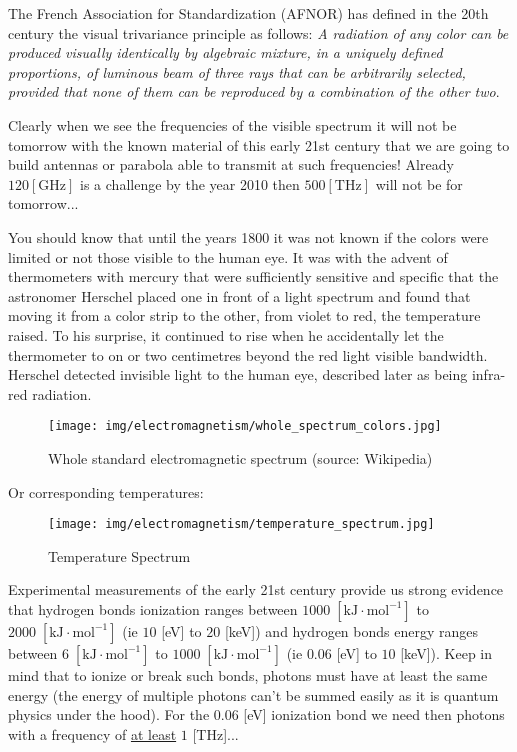	The French Association for Standardization (AFNOR) has defined in the 20th century the visual trivariance principle as follows:\textit{ A radiation of any color can be produced visually identically by algebraic mixture, in a uniquely defined proportions, of luminous beam of three rays that can be arbitrarily selected, provided that none of them can be reproduced by a combination of the other two}.
	
	Clearly when we see the frequencies of the visible spectrum it will not be tomorrow with the known material of this early 21st century that we are going to build antennas or parabola able to transmit at such frequencies! Already $120 [\text{GHz}]$ is a challenge by the year 2010 then $500 [\text{THz}]$ will not be for tomorrow...
	
	You should know that until the years 1800 it was not known if the colors were limited or not those visible to the human eye. It was with the advent of thermometers with mercury that were sufficiently sensitive and specific that the astronomer Herschel placed one in front of a light spectrum and found that moving it from a color strip to the other, from violet to red, the temperature raised. To his surprise, it continued to rise when he accidentally let the thermometer to on or two centimetres beyond the red light visible bandwidth. Herschel detected invisible light to the human eye, described later as being infra-red radiation.
	\begin{figure}[H]
		\centering
		\texttt{[image: img/electromagnetism/whole\_spectrum\_colors.jpg]}
		\caption[Whole standard electromagnetic spectrum]{Whole standard electromagnetic spectrum (source: Wikipedia)}
	\end{figure}
	Or corresponding temperatures:
	\begin{figure}[H]
		\centering
		\texttt{[image: img/electromagnetism/temperature\_spectrum.jpg]}
		\caption{Temperature Spectrum}
	\end{figure}
	
	\begin{tcolorbox}[title=Remark,colframe=black,arc=10pt]
	Experimental measurements of the early 21st century provide us strong evidence that hydrogen bonds ionization ranges between $1000\;[\text{kJ}\cdot \text{mol}^{-1}]$ to $2000\;[\text{kJ}\cdot \text{mol}^{-1}]$ (ie $10$ [eV] to $20$ [keV]) and hydrogen bonds energy ranges between $6\;[\text{kJ}\cdot \text{mol}^{-1}]$ to $1000\;[\text{kJ}\cdot \text{mol}^{-1}]$ (ie $0.06$ [eV] to $10$ [keV]). Keep in mind that to ionize or break such bonds, photons must have at least the same energy (the energy of multiple photons can't be summed easily as it is quantum physics under the hood). For the $0.06$ [eV] ionization bond we need then photons with a frequency of \underline{at least} $1$ [THz]...
	\end{tcolorbox}

